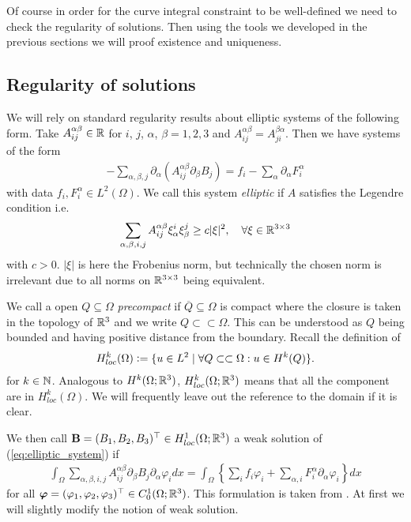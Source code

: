 \documentclass[../main.tex]{subfiles}
\begin{document}
Of course in order for the curve integral constraint to be well-defined 
we need to check the regularity of solutions. Then using the tools we developed
in the previous sections we will proof existence and uniqueness.

\subsection{Regularity of solutions}\label{sec:regularity_of_solutions}

We will rely on standard regularity results about elliptic systems 
of the following form. Take $A_{ij}^{\alpha \beta} \in \mathbb{R}$
for $i$, $j$, $\alpha$, $\beta = 1,2,3$ and 
$A_{ij}^{\alpha \beta} = A_{ji}^{\beta \alpha}$. Then we have systems of the 
form 
\begin{align}
    -\sum\limits_{\alpha, \beta, j} \partial_\alpha 
        (A_{ij}^{\alpha \beta} \partial_\beta B_j)
    = f_i - \sum\limits_\alpha \partial_\alpha F_i^\alpha
    \label{eq:elliptic_system}
\end{align}
with data $f_i, F_i^\alpha \in L^2(\Omega)$. We call this system 
\textit{elliptic} if $A$ satisfies the Legendre condition i.e.
\begin{align}
    \sum_{\alpha,\beta,i,j}A_{ij}^{\alpha \beta} \xi_\alpha^i \xi_\beta^j
    \geq c |\xi|^2, \quad \forall \xi \in \mathbb{R}^{3 \times 3} 
    \label{eq:legendre_condition}
\end{align}
with $c > 0$. $|\xi|$ is here the Frobenius norm, but technically the chosen 
norm is irrelevant due to all norms on $\mathbb{R}^{3 \times 3}$ being equivalent.

We call a open $Q \subseteq \Omega$ \textit{precompact} if 
$\overline{Q} \subseteq \Omega$ is compact where the closure is taken in the topology of $\mathbb{R}^3$
and we write $Q \subset\subset \Omega$. This can be understood as 
$Q$ being bounded and having positive distance from the boundary.
Recall the definition of 
\begin{align*}
    H^k_{loc}(\Omega) \vcentcolon= \{ u\in L^2 
        \mid \forall Q\subset\subset \Omega: u \in H^k(Q) \}.
\end{align*}
for $k \in \mathbb{N}$.
Analogous to $H^k(\Omega;\mathbb{R}^3)$, $H^k_{loc}(\Omega;\mathbb{R}^3)$ means that 
all the component are in $H^k_{loc}(\Omega)$. We will frequently leave out the 
reference to the domain if it is clear.

We then call $\mathbf{B} = (B_1, B_2, B_3)^\top \in H^1_{loc}(\Omega;\mathbb{R}^3)$ a weak solution
of (\ref{eq:elliptic_system}) if 
\begin{align}
    \int_\Omega \sum\limits_{\alpha,\beta,i,j} 
        A_{ij}^{\alpha \beta} \partial_\beta B_j \partial_\alpha \varphi_i dx
    = \int_\Omega \left\{ \sum\limits_i f_i \varphi_i + 
        \sum\limits_{\alpha,i} F_i^\alpha \partial_\alpha \varphi_i \right\} dx
    \label{eq:weak_elliptic_system}
\end{align}
for all $\bm{\varphi} = (\varphi_1, \varphi_2, \varphi_3)^\top \in C^1_0(\Omega;\mathbb{R}^3)$. 
This formulation is taken from 
\cite[Sec. 1.3]{lectures_on_elliptic_pdes}. At first we will slightly modify
the notion of weak solution. 
\end{document}
